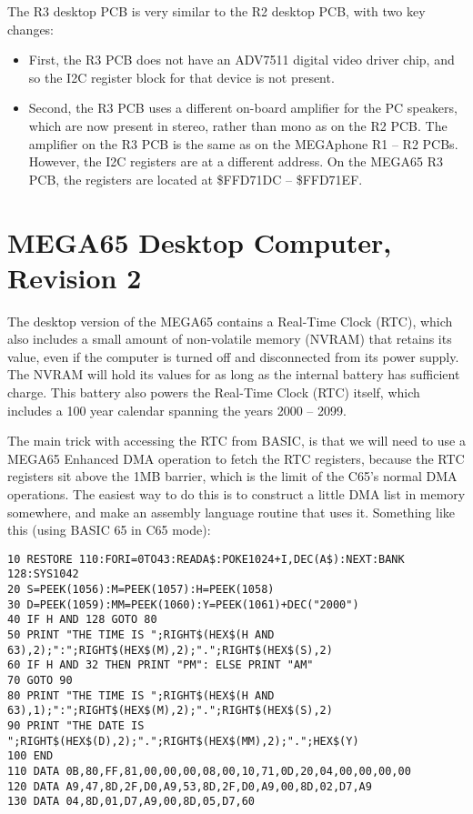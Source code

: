 The R3 desktop PCB is very similar to the R2 desktop PCB, with two key changes:

\begin{itemize}
\item First, the R3 PCB does not have an ADV7511 digital video driver chip, and so the I2C register block for that device is not present.
\item Second, the R3 PCB uses a different on-board amplifier for the PC speakers, which are now present in stereo, rather than mono
  as on the R2 PCB.  The amplifier on the R3 PCB is the same as on the MEGAphone R1 -- R2 PCBs.
  However, the I2C registers are at a different address.  On the MEGA65 R3 PCB, the registers are located at \$FFD71DC -- \$FFD71EF.
\end{itemize}



\section{MEGA65 Desktop Computer, Revision 2}

The desktop version of the MEGA65 contains a Real-Time Clock (RTC), which also includes a small amount of non-volatile memory (NVRAM)
that retains its value, even if the computer is turned off and disconnected from its power supply. The NVRAM will hold its values
for as long as the internal battery has sufficient charge.  This battery also powers the Real-Time Clock (RTC) itself, which includes
a 100 year calendar spanning the years 2000 -- 2099.

The main trick with accessing the RTC from BASIC, is that we will need to use a MEGA65 Enhanced DMA operation to fetch the RTC registers, because the RTC registers sit above the 1MB barrier, which is the limit of the C65's normal DMA operations.  The easiest way to do this is to construct a little DMA list in memory somewhere, and make an assembly language routine that uses it.  Something like this (using BASIC 65 in C65 mode):

\begin{tcolorbox}[colback=black,coltext=white]
\verbatimfont{\codefont}
\begin{verbatim}
10 RESTORE 110:FORI=0TO43:READA$:POKE1024+I,DEC(A$):NEXT:BANK 128:SYS1042
20 S=PEEK(1056):M=PEEK(1057):H=PEEK(1058)
30 D=PEEK(1059):MM=PEEK(1060):Y=PEEK(1061)+DEC("2000")
40 IF H AND 128 GOTO 80
50 PRINT "THE TIME IS ";RIGHT$(HEX$(H AND 63),2);":";RIGHT$(HEX$(M),2);".";RIGHT$(HEX$(S),2)
60 IF H AND 32 THEN PRINT "PM": ELSE PRINT "AM"
70 GOTO 90
80 PRINT "THE TIME IS ";RIGHT$(HEX$(H AND 63),1);":";RIGHT$(HEX$(M),2);".";RIGHT$(HEX$(S),2)
90 PRINT "THE DATE IS ";RIGHT$(HEX$(D),2);".";RIGHT$(HEX$(MM),2);".";HEX$(Y)
100 END
110 DATA 0B,80,FF,81,00,00,00,08,00,10,71,0D,20,04,00,00,00,00
120 DATA A9,47,8D,2F,D0,A9,53,8D,2F,D0,A9,00,8D,02,D7,A9
130 DATA 04,8D,01,D7,A9,00,8D,05,D7,60
\end{verbatim}
\end{tcolorbox}


